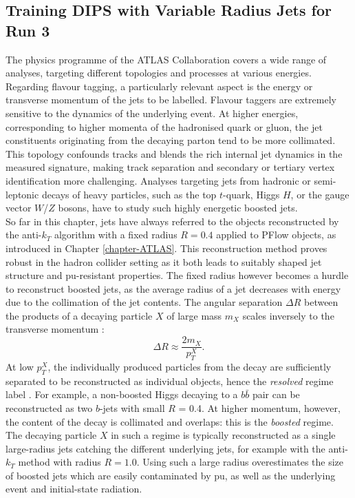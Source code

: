 \subsection{Training DIPS with Variable Radius Jets for Run 3}\label{chapter:dipsVRtrain}
The physics programme of the ATLAS Collaboration covers a wide range of analyses, targeting different topologies and processes at various energies. Regarding flavour tagging, a particularly relevant aspect is the energy or transverse momentum of the jets to be labelled. Flavour taggers are extremely sensitive to the dynamics of the underlying event. At higher energies, corresponding to higher momenta of the hadronised quark or gluon, the jet constituents originating from the decaying parton tend to be more collimated. This topology confounds tracks and blends the rich internal jet dynamics in the measured signature, making track separation and secondary or tertiary vertex identification more challenging. Analyses targeting jets from hadronic or semi-leptonic decays of heavy particles, such as the top $t$-quark, Higgs $H$, or the gauge vector $W$/$Z$ bosons, have to study such highly energetic boosted jets.  \\

So far in this chapter, jets have always referred to the objects reconstructed by the anti-$k_T$ algorithm with a fixed radius $R = 0.4$ applied to PFlow objects, as introduced in Chapter \ref{chapter-ATLAS}. This reconstruction method proves robust in the hadron collider setting as it both leads to suitably shaped jet structure and \gls{pu}-resistant properties. The fixed radius however becomes a hurdle to reconstruct boosted jets, as the average radius of a jet decreases with energy due to the collimation of the jet contents. The angular separation $\Delta R$ between the products of a decaying particle $X$ of large mass $m_X$ scales inversely to the transverse momentum \cite{ATLAS:largeRjet}: 
\begin{equation}\label{eq:sizeJet}
  \Delta R \approx \frac{2 m_X}{p_T^X}.
\end{equation}
At low $p_T^X$, the individually produced particles from the decay are sufficiently separated to be reconstructed as individual objects, hence the \textit{resolved} regime label \cite{ATLAS:2016hcf}. For example, a non-boosted Higgs decaying to a $b\bar{b}$ pair can be reconstructed as two $b$-jets with small $R$ = 0.4. At higher momentum, however, the content of the decay is collimated and overlaps: this is the \textit{boosted} regime. The decaying particle $X$ in such a regime is typically reconstructed as a single large-radius jets catching the different underlying jets, for example with the anti-$k_T$ method with radius $R = 1.0$. Using such a large radius overestimates the size of boosted jets which are easily contaminated by \gls{pu}, as well as the underlying event and initial-state radiation.  \\

